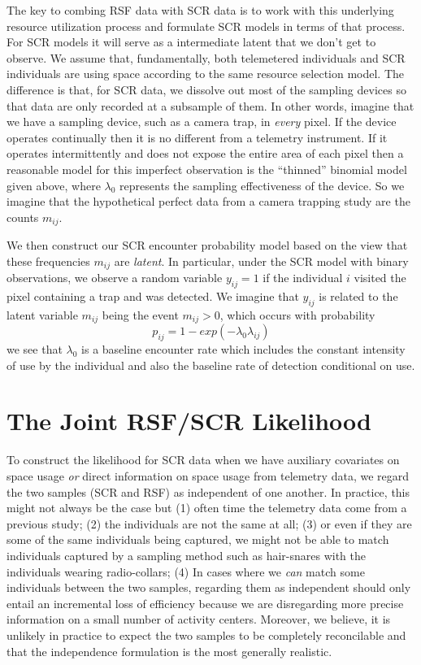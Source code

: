 The key to combing RSF data with SCR data is to work with this
underlying resource utilization process and formulate SCR models in
terms of that process. For SCR models it will serve as a intermediate
latent that we don't get to observe. We assume that, fundamentally,
both telemetered individuals and SCR individuals are using space
according to the same resource selection model. The difference is that,
for SCR data, we dissolve out most of the sampling devices so that
data are only recorded at a subsample of them.
In other words, imagine that we have a sampling device, such as a
camera trap, in {\it every} pixel. If the device operates continually
then it is no different from a telemetry instrument. If it
operates  intermittently and does not expose the entire area of
each pixel then a reasonable model for this imperfect observation is
the ``thinned'' binomial model given above, where $\lambda_{0}$
represents the sampling effectiveness of the device. So we imagine
that the hypothetical perfect data from a camera trapping study are
the counts $m_{ij}$.

We then construct our SCR encounter probability model based on the
view that these frequencies $m_{ij}$ are {\it latent}. In particular,
under the SCR model with binary observations,
 we observe a random variable
$y_{ij} = 1$  if the individual $i$ visited the pixel
containing a trap and was detected.
We imagine that $y_{ij}$ is related to the latent variable $m_{ij}$ being the
event $m_{ij}>0$, which occurs with probability
\[
 p_{ij} = 1-exp(- \lambda_{0} \lambda_{ij})
\]
we see that $\lambda_{0}$ is a baseline encounter rate which includes
the constant intensity of use by the individual and also the baseline
rate of detection conditional on use.



\section{The Joint RSF/SCR Likelihood}

To construct the likelihood for SCR data when we have auxiliary
covariates on space usage {\it or} direct information on space usage
from telemetry data, we regard the two samples (SCR and RSF) as
independent of one another. In practice, this might not always be the
case but (1) often time the telemetry data come from a previous study;
(2) the individuals are not the same at all; (3) or even if they are
some of the same individuals being captured, we might not be able to
match individuals captured by a sampling method such as hair-snares
with the individuals wearing radio-collars; (4) In cases where we {\it
  can} match some individuals between the two samples, regarding them as
independent should only entail an incremental loss of efficiency
because we are disregarding more precise information on a small number
of activity centers. Moreover, we believe, it is unlikely in practice
to expect the two samples to be completely reconcilable and that the
independence formulation is the most generally realistic. 

